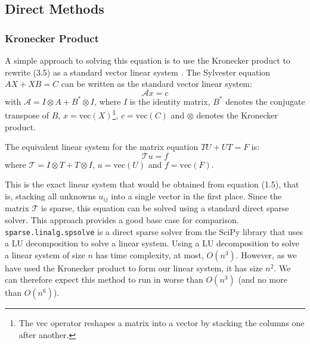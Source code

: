 \documentclass[11pt]{article}
\numberwithin{equation}{section}
\begin{document}
\subsection{Direct Methods}

\subsubsection{Kronecker Product}
A simple approach to solving this equation is to use the Kronecker product to rewrite (3.5) as a standard vector linear system \cite{Laub}. The Sylvester equation $AX + XB = C$ can be written as the standard vector linear system:
\begin{equation}
\mathcal{A}x = c
\end{equation}
with $\mathcal{A} = I \otimes A + B^* \otimes I$, where $I$ is the identity matrix, $B^*$ denotes the conjugate transpose of $B$, $x = \text{vec}(X)$\footnote{The vec operator reshapes a matrix into a vector by stacking the columns one after another.}, $c = \text{vec}(C)$ and $\otimes$ denotes the Kronecker product.

The equivalent linear system for the matrix equation $TU + UT = F$ is:
\begin{equation}
\mathcal{T}u = f
\end{equation}
where $\mathcal{T} = I \otimes T + T \otimes I$, $u = \text{vec}(U)$ and $f = \text{vec}(F)$.

This is the exact linear system that would be obtained from equation (1.5), that is, stacking all unknowns $u_{ij}$ into a single vector in the first place. Since the matrix $\mathcal{T}$ is sparse, this equation can be solved using a standard direct sparse solver. This approach provides a good base case for comparison. \texttt{sparse.linalg.spsolve} is a direct sparse solver from the SciPy library that uses a LU decomposition to solve a linear system. Using a LU decomposition to solve a linear system of size $n$ has time complexity, at most, $O(n^3)$. However, as we have used the Kronecker product to form our linear system, it has size $n^2$. We can therefore expect this method to run in worse than $O(n^3)$ (and no more than $O(n^6)$).
\end{document}
